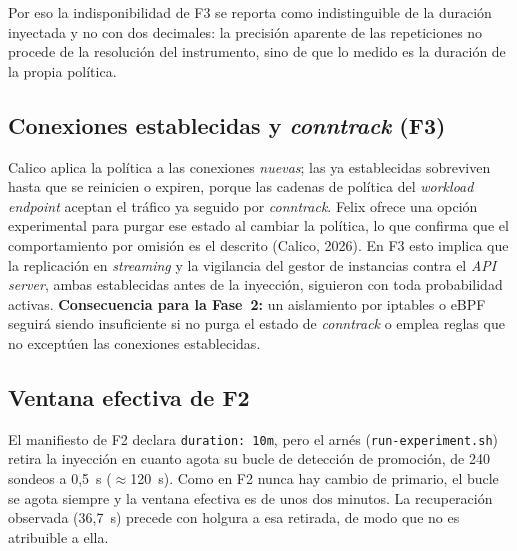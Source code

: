 \documentclass[11pt,letterpaper]{article}
\begin{document}
Por eso la indisponibilidad de F3 se reporta como indistinguible de la duración inyectada y no con
dos decimales: la precisión aparente de las repeticiones no procede de la resolución del
instrumento, sino de que lo medido es la duración de la propia política.

\subsection*{Conexiones establecidas y \textit{conntrack} (F3)}
Calico aplica la política a las conexiones \emph{nuevas}; las ya establecidas sobreviven hasta que
se reinicien o expiren, porque las cadenas de política del \textit{workload endpoint} aceptan el
tráfico ya seguido por \textit{conntrack}. Felix ofrece una opción experimental para purgar ese
estado al cambiar la política, lo que confirma que el comportamiento por omisión es el descrito
(Calico, 2026). En F3 esto implica que la replicación en \textit{streaming} y la vigilancia del
gestor de instancias contra el \textit{API server}, ambas establecidas antes de la inyección,
siguieron con toda probabilidad activas. \textbf{Consecuencia para la Fase~2:} un aislamiento por
iptables o eBPF seguirá siendo insuficiente si no purga el estado de \textit{conntrack} o emplea
reglas que no exceptúen las conexiones establecidas.

\subsection*{Ventana efectiva de F2}
El manifiesto de F2 declara \texttt{duration: 10m}, pero el arnés (\texttt{run-experiment.sh})
retira la inyección en cuanto agota su bucle de detección de promoción, de 240 sondeos a 0,5~s
($\approx$120~s). Como en F2 nunca hay cambio de primario, el bucle se agota siempre y la ventana
efectiva es de unos dos minutos. La recuperación observada (36,7~s) precede con holgura a esa
retirada, de modo que no es atribuible a ella.
\end{document}
